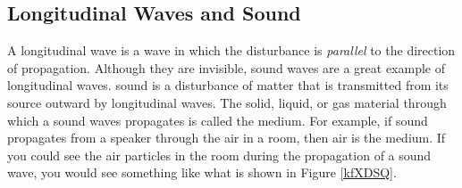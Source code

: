 \documentclass[main.tex]{subfiles}
\begin{document}
\clearpage
\subsection{Longitudinal Waves and Sound} \label{FpyvAr}

\begin{center}
    \captionsetup{type=figure,margin=1in}
    \label{fig:my_label}
\end{center}

A \gls{longitudinal wave} is a wave in which the disturbance is \textit{parallel} to the direction of propagation. Although they are invisible, sound waves are a great example of longitudinal waves. \Gls{sound} is a disturbance of matter that is transmitted from its source outward by longitudinal waves. The solid, liquid, or gas material through which a sound waves propagates is called the \gls{medium}. For example, if sound propagates from a speaker through the air in a room, then air is the medium. If you could see the air particles in the room during the propagation of a sound wave, you would see something like what is shown in Figure \ref{kfXDSQ}.
\end{document}
